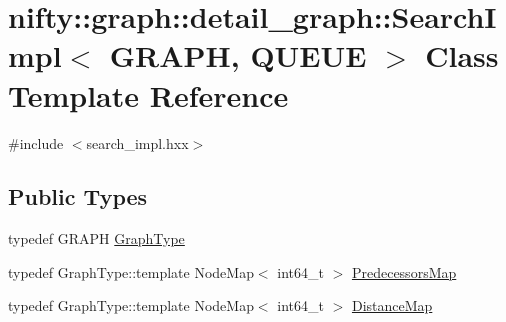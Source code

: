 \hypertarget{classnifty_1_1graph_1_1detail__graph_1_1SearchImpl}{}\section{nifty\+:\+:graph\+:\+:detail\+\_\+graph\+:\+:Search\+Impl$<$ G\+R\+A\+PH, Q\+U\+E\+UE $>$ Class Template Reference}
\label{classnifty_1_1graph_1_1detail__graph_1_1SearchImpl}


{\ttfamily \#include $<$search\+\_\+impl.\+hxx$>$}

\subsection*{Public Types}
\begin{DoxyCompactItemize}
\item 
typedef G\+R\+A\+PH \hyperlink{classnifty_1_1graph_1_1detail__graph_1_1SearchImpl_a62a34d3de4ba4e0bc6b81eb4bf32bd9b}{Graph\+Type}
\item 
typedef Graph\+Type\+::template Node\+Map$<$ int64\+\_\+t $>$ \hyperlink{classnifty_1_1graph_1_1detail__graph_1_1SearchImpl_a23e9569c5680c5fd50f5f16235ef8016}{Predecessors\+Map}
\item 
typedef Graph\+Type\+::template Node\+Map$<$ int64\+\_\+t $>$ \hyperlink{classnifty_1_1graph_1_1detail__graph_1_1SearchImpl_a9f3e049a2ddbf34d81d9db4b7dd2839f}{Distance\+Map}
\end{DoxyCompactItemize}
